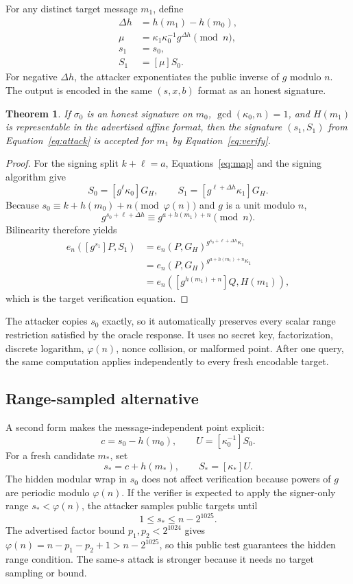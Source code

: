 \documentclass[10pt,a4paper]{article}
\newtheorem{theorem}{Theorem}
\newcommand{\GH}{G_H}
\begin{document}
For any distinct target message $m_1$, define
\begin{align}
  \Delta h &= h(m_1)-h(m_0),\\
  \mu &= \kappa_1\kappa_0^{-1}g^{\Delta h}\pmod n,\\
  s_1 &= s_0,\\
  S_1 &= [\mu]S_0.
  \label{eq:attack}
\end{align}
For negative $\Delta h$, the attacker exponentiates the public inverse of
$g$ modulo $n$.  The output is encoded in the same $(s,x,b)$ format as an
honest signature.

\begin{theorem}
If $\sigma_0$ is an honest signature on $m_0$,
$\gcd(\kappa_0,n)=1$, and $H(m_1)$ is representable in the advertised affine
format, then the signature $(s_1,S_1)$ from Equation~\eqref{eq:attack} is
accepted for $m_1$ by Equation~\eqref{eq:verify}.
\end{theorem}

\begin{proof}
For the signing split $k+\ell=a$, Equations~\eqref{eq:map} and the signing
algorithm give
\[
  S_0=[g^\ell\kappa_0]\GH,
  \qquad
  S_1=[g^{\ell+\Delta h}\kappa_1]\GH.
\]
Because $s_0\equiv k+h(m_0)+n\pmod{\varphi(n)}$ and $g$ is a unit modulo
$n$,
\[
 g^{s_0+\ell+\Delta h}
 \equiv g^{a+h(m_1)+n}\pmod n.
\]
Bilinearity therefore yields
\begin{align*}
 e_n([g^{s_1}]P,S_1)
 &=e_n(P,\GH)^{g^{s_0+\ell+\Delta h}\kappa_1}\\
 &=e_n(P,\GH)^{g^{a+h(m_1)+n}\kappa_1}\\
 &=e_n([g^{h(m_1)+n}]Q,H(m_1)),
\end{align*}
which is the target verification equation.
\end{proof}

The attacker copies $s_0$ exactly, so it automatically preserves every scalar
range restriction satisfied by the oracle response.  It uses no secret key,
factorization, discrete logarithm, $\varphi(n)$, nonce collision, or malformed
point.  After one query, the same computation applies independently to every
fresh encodable target.

\subsection{Range-sampled alternative}

A second form makes the message-independent point explicit:
\[
 c=s_0-h(m_0),\qquad
 U=[\kappa_0^{-1}]S_0.
\]
For a fresh candidate $m_*$, set
\[
 s_*=c+h(m_*),\qquad S_*=[\kappa_*]U.
\]
The hidden modular wrap in $s_0$ does not affect verification because powers
of $g$ are periodic modulo $\varphi(n)$.  If the verifier is expected to apply
the signer-only range $s_*<\varphi(n)$, the attacker samples public targets
until
\[
  1\le s_*\le n-2^{1025}.
\]
The advertised factor bound $p_1,p_2<2^{1024}$ gives
$\varphi(n)=n-p_1-p_2+1>n-2^{1025}$, so this public test guarantees the hidden
range condition.  The same-$s$ attack is stronger because it needs no target
sampling or bound.
\end{document}

